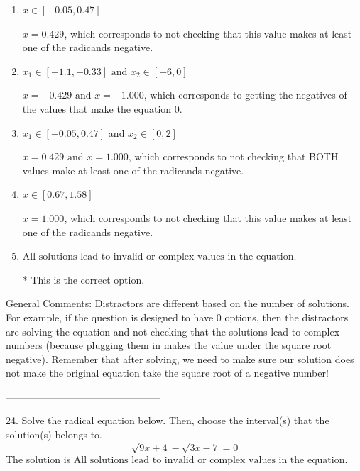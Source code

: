 \documentclass{article}[14pt]
\begin{document}
\begin{enumerate}[label=\Alph*.] 
\item $ x \in [-0.05,0.47] $ 

 $x = 0.429$, which corresponds to not checking that this value makes at least one of the radicands negative. 
\item $ x_1 \in [-1.1, -0.33] \text{ and } x_2 \in [-6,0] $ 

 $x = -0.429 \text{ and } x = -1.000$, which corresponds to getting the negatives of the values that make the equation 0. 
\item $ x_1 \in [-0.05, 0.47] \text{ and } x_2 \in [0,2] $ 

 $x = 0.429 \text{ and } x = 1.000$, which corresponds to not checking that BOTH values make at least one of the radicands negative. 
\item $ x \in [0.67,1.58] $ 

 $x = 1.000$, which corresponds to not checking that this value makes at least one of the radicands negative. 
\item $ \text{All solutions lead to invalid or complex values in the equation.} $ 

 * This is the correct option. 
\end{enumerate} 
 
General Comments: Distractors are different based on the number of solutions. For example, if the question is designed to have 0 options, then the distractors are solving the equation and not checking that the solutions lead to complex numbers (because plugging them in makes the value under the square root negative). Remember that after solving, we need to make sure our solution does not make the original equation take the square root of a negative number!

-----------------------------------------------

24. Solve the radical equation below. Then, choose the interval(s) that the solution(s) belongs to.
$$ \sqrt{9 x + 4} - \sqrt{3 x - 7} = 0 $$ 
The solution is $ \text{All solutions lead to invalid or complex values in the equation.} $ 
\end{document}
